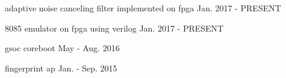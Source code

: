 \begin{cventries}
	\cventry
		{}
    	{adaptive noise canceling filter implemented on fpga}
    	{}
    	{Jan. 2017 - PRESENT}
    	{
	    \begin{cvitems}
    		\item{}
		\end{cvitems}
    	}

    \cventry
		{}
        {8085 emulator on fpga using verilog}
        {}
        {Jan. 2017 - PRESENT}
        {
		\begin{cvitems}
        	\item{}
      \end{cvitems}
    }
    
  	\cventry
		{}
        {gsoc coreboot}
        {}
        {May - Aug. 2016}
        {
		\begin{cvitems}
        	\item{}
      \end{cvitems}
    }
    
    \cventry
		{}
        {fingerprint ap}
        {}
        {Jan. - Sep. 2015}
        {
		\begin{cvitems}
        	\item{}
      \end{cvitems}
    }
    
\end{cventries}

